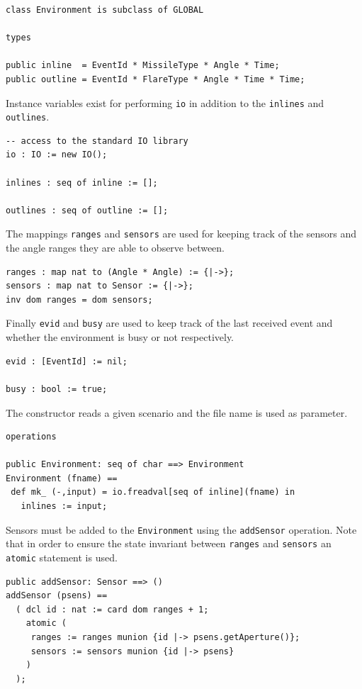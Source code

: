\documentclass{overturerepchap}
\begin{document}
\begin{lstlisting}
class Environment is subclass of GLOBAL

types

public inline  = EventId * MissileType * Angle * Time;
public outline = EventId * FlareType * Angle * Time * Time;
\end{lstlisting}

Instance variables exist for performing \texttt{io} in addition to the 
\texttt{inlines} and \texttt{outlines}.

\begin{lstlisting}
-- access to the standard IO library
io : IO := new IO();

inlines : seq of inline := [];

outlines : seq of outline := [];
\end{lstlisting}

The mappings \texttt{ranges} and \texttt{sensors} are used for keeping 
track of the sensors and the angle ranges they are able to observe between.

\begin{lstlisting}
ranges : map nat to (Angle * Angle) := {|->};
sensors : map nat to Sensor := {|->};
inv dom ranges = dom sensors;
\end{lstlisting}

Finally \texttt{evid} and \texttt{busy} are used to keep track of the last 
received event and whether the environment is busy or not respectively.

\begin{lstlisting}
evid : [EventId] := nil;

busy : bool := true;
\end{lstlisting}

The constructor reads a given scenario and the file name is used as parameter.

\begin{lstlisting}
operations

public Environment: seq of char ==> Environment
Environment (fname) ==
 def mk_ (-,input) = io.freadval[seq of inline](fname) in
   inlines := input;
\end{lstlisting}

Sensors must be added to the \texttt{Environment} using the \texttt{addSensor}
operation. Note that in order to ensure the state invariant between 
\texttt{ranges} and \texttt{sensors} an \texttt{atomic} statement is used.

\begin{lstlisting}
public addSensor: Sensor ==> ()
addSensor (psens) ==
  ( dcl id : nat := card dom ranges + 1;
    atomic (
     ranges := ranges munion {id |-> psens.getAperture()};
     sensors := sensors munion {id |-> psens} 
    )
  );
\end{lstlisting}
\end{document}
